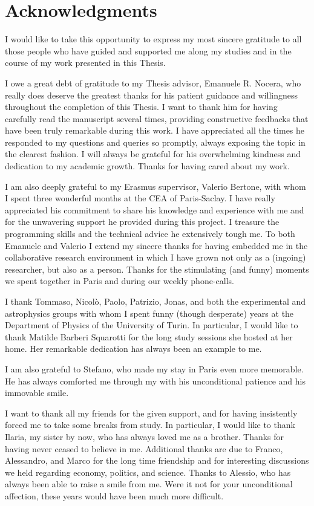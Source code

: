 \chapter*{Acknowledgments}
%
I would like to take this opportunity to express my most sincere gratitude to all those people who have guided and supported me along my studies and in the course of my work presented in this Thesis.\medbreak

\noindent I owe a great debt of gratitude to my Thesis advisor, Emanuele R. Nocera, who really does deserve the greatest thanks for his patient guidance and willingness throughout the completion of this Thesis. I want to thank him for having carefully read the manuscript several times, providing constructive feedbacks that have been truly remarkable during this work. I have appreciated all the times he responded to my questions and queries so promptly, always exposing the topic in the clearest fashion. I will always be grateful for his overwhelming kindness and dedication to my academic growth. Thanks for having cared about my work.  
\medbreak

\noindent I am also deeply grateful to my Erasmus supervisor, Valerio Bertone, with whom I spent three wonderful months at the CEA of Paris-Saclay. I have really appreciated his commitment to share his knowledge and experience with me and for the unwavering support he provided during this project. I treasure the programming skills and the technical advice he extensively tough me. To both Emanuele and Valerio I extend my sincere thanks for having embedded me in the collaborative research environment in which I have grown not only as a (ingoing) researcher, but also as a person. Thanks for the stimulating (and funny) moments we spent together in Paris and during our weekly phone-calls.\medbreak

\noindent I thank Tommaso, Nicolò, Paolo, Patrizio, Jonas, and both the experimental and astrophysics groups with whom I spent funny (though desperate) years at the Department of Physics of the University of Turin. In particular, I would like to thank Matilde Barberi Squarotti for the long study sessions she hosted at her home. Her remarkable dedication has always been an example to me.\medbreak

\noindent I am also grateful to Stefano, who made my stay in Paris even more memorable. He has always comforted me through my  with his unconditional patience and his immovable smile.\medbreak

\noindent I want to thank all my friends for the given support, and for having insistently forced me to take some breaks from study. In particular, I would like to thank Ilaria, my sister by now, who has always loved me as a brother. Thanks for having never ceased to believe in me. Additional thanks are due to Franco, Alessandro, and Marco for the long time friendship and for interesting discussions we held regarding economy, politics, and science. Thanks to Alessio, who has always been able to raise a smile from me. Were it not for your unconditional affection, these years would have been much more difficult.\medbreak

